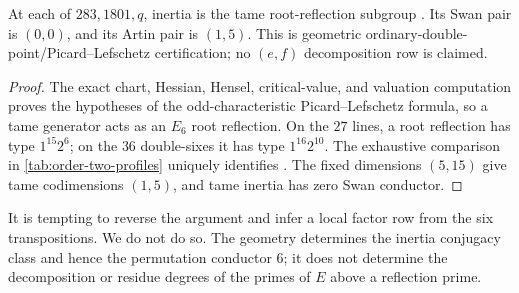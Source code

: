 \begin{table}[ht]
\centering
\caption{All order-two subgroup profiles.  The element-index column belongs
to the character table, not the table of marks.}
\label{tab:order-two-profiles}
\end{table}

\begin{proposition}
\label{prop:reflection}
At each of $283,1801,q$, inertia is the tame root-reflection subgroup
.  Its Swan pair is $(0,0)$, and its Artin pair is $(1,5)$.  This is
geometric ordinary-double-point/Picard--Lefschetz certification; no $(e,f)$
decomposition row is claimed.
\end{proposition}

\begin{proof}
The exact chart, Hessian, Hensel, critical-value, and valuation computation
proves the hypotheses of the odd-characteristic Picard--Lefschetz formula,
so a tame generator acts as an $E_6$ root reflection.  On the $27$ lines, a
root reflection has type $1^{15}2^6$; on the $36$ double-sixes it has type
$1^{16}2^{10}$.  The exhaustive comparison in
\cref{tab:order-two-profiles} uniquely identifies .  The fixed
dimensions $(5,15)$ give tame codimensions $(1,5)$, and tame inertia has zero
Swan conductor.
\end{proof}

It is tempting to reverse the argument and infer a local factor row from the
six transpositions.  We do not do so.  The geometry determines the inertia
conjugacy class and hence the permutation conductor $6$; it does not
determine the decomposition or residue degrees of the primes of $E$ above a
reflection prime.

